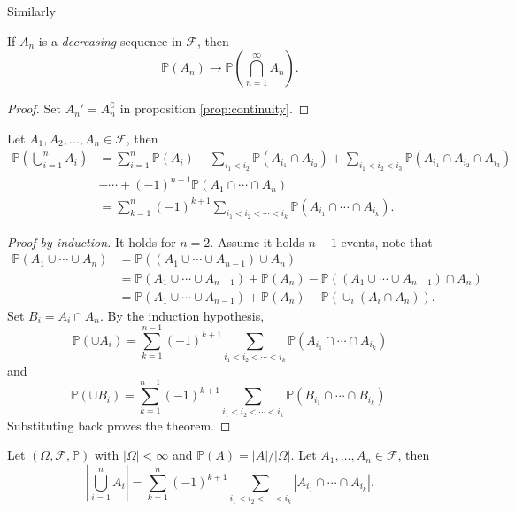 Similarly 
\begin{corollary}\label{col:continuity2}
    If $ A_n $ is a \textit{decreasing} sequence in $ \mathscr{F} $, then 
    \[
        \mathbb{P}(A_n)\to \mathbb{P}\left( \bigcap_{n=1}^{\infty}A_n \right).
    \]
\end{corollary}
\begin{proof}
    Set $ A_n' = A_n^{\complement} $ in proposition \ref{prop:continuity}.
\end{proof}

\begin{proposition}\label{prop:Inclusion-exclusion formula}
    Let $ A_1,A_2, \dots, A_n\in \mathscr{F} $, then 
    \begin{align*}
        \mathbb{P}\left( \bigcup_{i=1}^{n}A_i \right) &= \sum_{i=1}^{n}\mathbb{P}(A_i) - \sum_{i_1<i_2} \mathbb{P}(A_{i_1}\cap A_{i_2})+\sum_{i_1<i_2<i_3}\mathbb{P}(A_{i_1}\cap A_{i_2}\cap A_{i_3})\\ 
        &-\cdots+ (-1)^{n+1} \mathbb{P}(A_1 \cap \cdots \cap A_n)\\ 
        &=\sum_{k=1}^{n}(-1)^{k+1} \sum_{i_1<i_2<\cdots<i_k}\mathbb{P}\left( A_{i_1}\cap \cdots \cap A_{i_k} \right).
    \end{align*}
\end{proposition}
\begin{proof}[Proof by induction]
    It holds for $n=2$. Assume it holds $n-1$ events, note that 
    \begin{align*}
        \mathbb{P}(A_1 \cup \cdots \cup A_n)&= \mathbb{P}\left( (A_1 \cup \cdots \cup A_{n-1}) \cup A_n \right)\\ 
        &= \mathbb{P}(A_1 \cup \cdots \cup A_{n-1})+\mathbb{P}(A_n)-\mathbb{P}((A_1 \cup \cdots \cup A_{n-1})\cap A_n)\\ 
        &= \mathbb{P}(A_1 \cup \cdots \cup A_{n-1})+\mathbb{P}(A_n)-\mathbb{P}(\cup_i (A_i\cap A_n)).
    \end{align*}
    Set $ B_i=A_i\cap A_n $. By the induction hypothesis,
    \[
        \mathbb{P}(\cup A_i)=\sum_{k=1}^{n-1}(-1)^{k+1} \sum_{i_1<i_2<\cdots<i_k}\mathbb{P}\left( A_{i_1}\cap \cdots \cap A_{i_k} \right)
    \]
    and 
    \[
        \mathbb{P}(\cup B_i)=\sum_{k=1}^{n-1}(-1)^{k+1} \sum_{i_1<i_2<\cdots<i_k}\mathbb{P}\left( B_{i_1}\cap \cdots \cap B_{i_k} \right).
    \]
    Substituting back proves the theorem.
\end{proof}
\begin{corollary}\label{col:inclusion-exclusion2}
        Let $ (\Omega,\mathscr{F},\mathbb{P}) $ with $ |\Omega|<\infty  $ and $ \mathbb{P}(A)=|A|/|\Omega| $. Let $ A_1,\dots,A_n\in \mathscr{F} $, then 
        \[
            \left| \bigcup_{i=1}^{n}A_i \right| = \sum_{k=1}^{n}(-1)^{k+1} \sum_{i_1<i_2<\cdots<i_k}\left| A_{i_1}\cap \cdots \cap A_{i_k} \right|.
        \]
\end{corollary}

